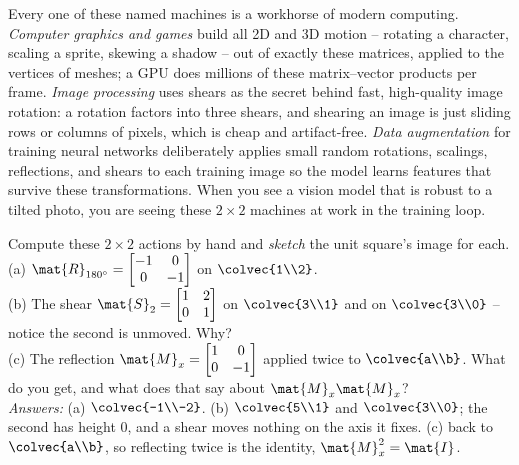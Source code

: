 \begin{applicationbox}
Every one of these named machines is a workhorse of modern computing.
\emph{Computer graphics and games} build all 2D and 3D motion -- rotating a
character, scaling a sprite, skewing a shadow -- out of exactly these matrices,
applied to the vertices of meshes; a GPU does millions of these matrix--vector
products per frame. \emph{Image processing} uses shears as the secret behind fast,
high-quality image rotation: a rotation factors into three shears, and shearing
an image is just sliding rows or columns of pixels, which is cheap and
artifact-free. \emph{Data augmentation} for training neural networks deliberately
applies small random rotations, scalings, reflections, and shears to each training
image so the model learns features that survive these transformations. When you
see a vision model that is robust to a tilted photo, you are seeing these
$2\times 2$ machines at work in the training loop.
\end{applicationbox}

\begin{labbox}
Compute these $2\times 2$ actions by hand and \emph{sketch} the unit square's
image for each. \\[0.3em]
(a) $\mat{R}_{180^\circ} = \begin{bmatrix} -1 & 0 \\ 0 & -1\end{bmatrix}$ on
$\colvec{1\\2}$. \\
(b) The shear $\mat{S}_2 = \begin{bmatrix} 1 & 2 \\ 0 & 1\end{bmatrix}$ on
$\colvec{3\\1}$ and on $\colvec{3\\0}$ -- notice the second is unmoved. Why? \\
(c) The reflection $\mat{M}_x = \begin{bmatrix} 1 & 0 \\ 0 & -1\end{bmatrix}$
applied twice to $\colvec{a\\b}$. What do you get, and what does that say about
$\mat{M}_x\mat{M}_x$? \\[0.3em]
\emph{Answers:} (a) $\colvec{-1\\-2}$. (b) $\colvec{5\\1}$ and $\colvec{3\\0}$;
the second has height $0$, and a shear moves nothing on the axis it fixes. (c)
back to $\colvec{a\\b}$, so reflecting twice is the identity, $\mat{M}_x^2 =
\mat{I}$.
\end{labbox}

